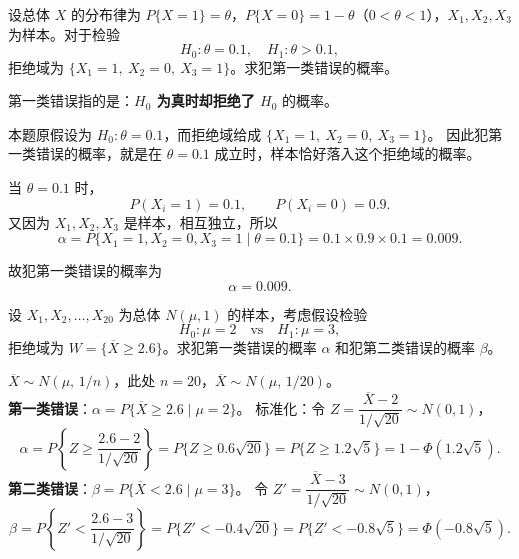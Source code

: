 ﻿\documentclass[lang=cn,11pt]{elegantbook}
\begin{document}
\begin{exercise}[离散总体第一类错误的计算] \label{ex:error_discrete}
设总体 \(X\) 的分布律为 \(P\{X=1\}=\theta\)，\(P\{X=0\}=1-\theta\)（\(0<\theta<1\)），\(X_1,X_2,X_3\) 为样本。对于检验
\[
H_0\colon\theta=0.1,\quad H_1\colon\theta>0.1,
\]
拒绝域为 \(\{X_1=1,\ X_2=0,\ X_3=1\}\)。求犯第一类错误的概率。
\end{exercise}
\begin{solution}
第一类错误指的是：\textbf{\(H_0\) 为真时却拒绝了 \(H_0\)} 的概率。

本题原假设为 \(H_0:\theta=0.1\)，而拒绝域给成 \(\{X_1=1,\ X_2=0,\ X_3=1\}\)。
因此犯第一类错误的概率，就是在 \(\theta=0.1\) 成立时，样本恰好落入这个拒绝域的概率。

当 \(\theta=0.1\) 时，
\[
P(X_i=1)=0.1,\qquad P(X_i=0)=0.9.
\]
又因为 \(X_1,X_2,X_3\) 是样本，相互独立，所以
\[
\alpha=P\{X_1=1,X_2=0,X_3=1\mid\theta=0.1\}=0.1\times0.9\times0.1=0.009.
\]

故犯第一类错误的概率为
\[
\alpha=0.009.
\]
\end{solution}


\begin{exercise}[正态总体两类错误的计算] \label{ex:error_normal}
设 \(X_1,X_2,\dots,X_{20}\) 为总体 \(N(\mu,1)\) 的样本，考虑假设检验
\[
H_0\colon\mu=2\quad\text{vs}\quad H_1\colon\mu=3,
\]
拒绝域为 \(W=\{\overline{X}\geq 2.6\}\)。求犯第一类错误的概率 \(\alpha\) 和犯第二类错误的概率 \(\beta\)。
\end{exercise}
\begin{solution}
\(\overline{X}\sim N(\mu,\,1/n)\)，此处 \(n=20\)，\(\overline{X}\sim N(\mu,\,1/20)\)。\\
\textbf{第一类错误}：\(\alpha=P\{\overline{X}\geq2.6\mid\mu=2\}\)。
标准化：令 \(Z=\dfrac{\overline{X}-2}{1/\sqrt{20}}\sim N(0,1)\)，
\[
\alpha=P\!\left\{Z\geq\frac{2.6-2}{1/\sqrt{20}}\right\}=P\{Z\geq 0.6\sqrt{20}\}=P\{Z\geq 1.2\sqrt{5}\}=1-\Phi(1.2\sqrt{5}).
\]
\textbf{第二类错误}：\(\beta=P\{\overline{X}<2.6\mid\mu=3\}\)。
令 \(Z'=\dfrac{\overline{X}-3}{1/\sqrt{20}}\sim N(0,1)\)，
\[
\beta=P\!\left\{Z'<\frac{2.6-3}{1/\sqrt{20}}\right\}=P\{Z'<-0.4\sqrt{20}\}=P\{Z'<-0.8\sqrt{5}\}=\Phi(-0.8\sqrt{5}).
\]
\end{solution}
\end{document}

